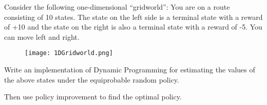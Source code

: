 
\begin{exercise}

\phantom{}

Consider the following one-dimensional ``gridworld'': You are on a route consisting
of 10 states. The state on the left side is a terminal state with a reward of +10
and the state on the right is also a terminal state with a reward of -5. You can move
left and right.

\begin{figure}[H]
    \centering
    \texttt{[image: 1DGridworld.png]}
\end{figure}

Write an implementation of Dynamic Programming for estimating the values of the
above states under the equiprobable random policy.

Then use policy improvement to find the optimal policy.

\end{exercise}


\begin{solution}

\phantom{}

\end{solution}

